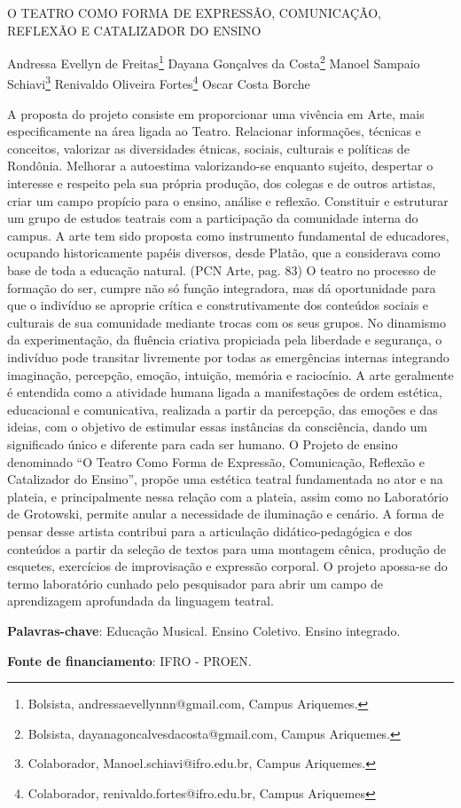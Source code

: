 \documentclass[article,12pt,onesidea,4paper,english,brazil]{abntex2}
\begin{document}
	
	
	\frenchspacing 
	
	\begin{center}
		\LARGE O TEATRO COMO FORMA DE EXPRESSÃO, COMUNICAÇÃO, REFLEXÃO E
		CATALIZADOR DO ENSINO
		
		\normalsize
		Andressa Evellyn de Freitas\footnote{Bolsista, andressaevellynnn@gmail.com, Campus Ariquemes.} 
		Dayana Gonçalves da Costa\footnote{Bolsista, dayanagoncalvesdacosta@gmail.com, Campus Ariquemes.} 
		Manoel Sampaio Schiavi\footnote{Colaborador, Manoel.schiavi@ifro.edu.br, Campus Ariquemes.} 
	Renivaldo Oliveira Fortes\footnote{Colaborador, renivaldo.fortes@ifro.edu.br, Campus Ariquemes} 
   Oscar Costa Borche
	\end{center}
	
	\noindent A proposta do projeto consiste em proporcionar uma vivência em Arte, mais
	especificamente na área ligada ao Teatro. Relacionar informações, técnicas e
	conceitos, valorizar as diversidades étnicas, sociais, culturais e políticas de
	Rondônia. Melhorar a autoestima valorizando-se enquanto sujeito, despertar o
	interesse e respeito pela sua própria produção, dos colegas e de outros artistas,
	criar um campo propício para o ensino, análise e reflexão. Constituir e estruturar um
	grupo de estudos teatrais com a participação da comunidade interna do campus.
	A arte tem sido proposta como instrumento fundamental de educadores, ocupando
	historicamente papéis diversos, desde Platão, que a considerava como base de toda
	a educação natural. (PCN Arte, pag. 83)
	O teatro no processo de formação do ser, cumpre não só função integradora, mas
	dá oportunidade para que o indivíduo se aproprie crítica e construtivamente dos
	conteúdos sociais e culturais de sua comunidade mediante trocas com os seus
	grupos. No dinamismo da experimentação, da fluência criativa propiciada pela
	liberdade e segurança, o indivíduo pode transitar livremente por todas as
	emergências internas integrando imaginação, percepção, emoção, intuição, memória
	e raciocínio. A arte geralmente é entendida como a atividade humana ligada a
	manifestações de ordem estética, educacional e comunicativa, realizada a partir da
	percepção, das emoções e das ideias, com o objetivo de estimular essas instâncias
	da consciência, dando um significado único e diferente para cada ser humano.
	O Projeto de ensino denominado “O Teatro Como Forma de Expressão,
	Comunicação, Reflexão e Catalizador do Ensino”, propõe uma estética teatral
	fundamentada no ator e na plateia, e principalmente nessa relação com a plateia,
	assim como no Laboratório de Grotowski, permite anular a necessidade de
	iluminação e cenário. A forma de pensar desse artista contribui para a articulação
	didático-pedagógica e dos conteúdos a partir da seleção de textos para uma
	montagem cênica, produção de esquetes, exercícios de improvisação e expressão
	corporal. O projeto apossa-se do termo laboratório cunhado pelo pesquisador para
	abrir um campo de aprendizagem aprofundada da linguagem teatral.
	
	\vspace{\onelineskip}
	
	\noindent
	\textbf{Palavras-chave}: Educação Musical. Ensino Coletivo. Ensino integrado.
	
		\vspace{\onelineskip}
	
	\noindent
	\textbf{Fonte de financiamento}: IFRO - PROEN.
\end{document}
